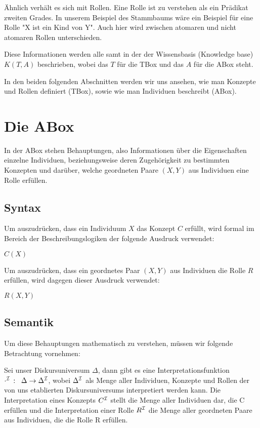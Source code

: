 \documentclass[runningheads,a4paper]{llncs}
\begin{document}
Ähnlich verhält es sich mit Rollen. Eine Rolle ist zu verstehen als ein Prädikat zweiten Grades. In unserem Beispiel des Stammbaums wäre ein Beispiel für eine Rolle "X ist ein Kind von Y". Auch hier wird zwischen atomaren und nicht atomaren Rollen unterschieden.

Diese Informationen werden alle samt in der der Wissensbasis (Knowledge base) $K(T,A)$ beschrieben, wobei das $T$ für die TBox und das $A$ für die ABox steht.

 In den beiden folgenden Abschnitten werden wir uns ansehen, wie man Konzepte und Rollen definiert (TBox), sowie wie man Individuen beschreibt (ABox).

\section{Die ABox}

In der ABox stehen Behauptungen, also Informationen über die Eigenschaften einzelne Individuen, beziehungsweise deren Zugehörigkeit zu bestimmten Konzepten und darüber, welche geordneten Paare $(X,Y)$ aus Individuen eine Rolle erfüllen.

\subsection{Syntax}

Um auszudrücken, dass ein Individuum $X$ das Konzept $C$ erfüllt, wird formal im Bereich der Beschreibungslogiken der folgende Ausdruck verwendet:

	\begin{center}
	$C(X)$
	\end{center}

Um auszudrücken, dass ein geordnetes Paar $(X,Y)$ aus Individuen die Rolle $R$ erfüllen, wird dagegen dieser Ausdruck verwendet:

	\begin{center}
	$R(X,Y)$
	\end{center}

\subsection{Semantik}

Um diese Behauptungen mathematisch zu verstehen, müssen wir folgende Betrachtung vornehmen:

Sei unser Diskursuniversum $\Delta$, dann gibt es eine Interpretationsfunktion \linebreak $\cdot^{\cal I}\,:\;\;\Delta \rightarrow \Delta^{\cal I}$, wobei $\Delta^{\cal I}$ als Menge aller Individuen, Konzepte und Rollen der von uns etablierten Diskursuniversums interpretiert werden kann. Die Interpretation eines Konzepts $C^{\cal I}$ stellt die Menge aller Individuen dar, die C erfüllen und die Interpretation einer Rolle $R^{\cal I}$ die Menge aller geordneten Paare aus Individuen, die die Rolle R erfüllen.
\end{document}
